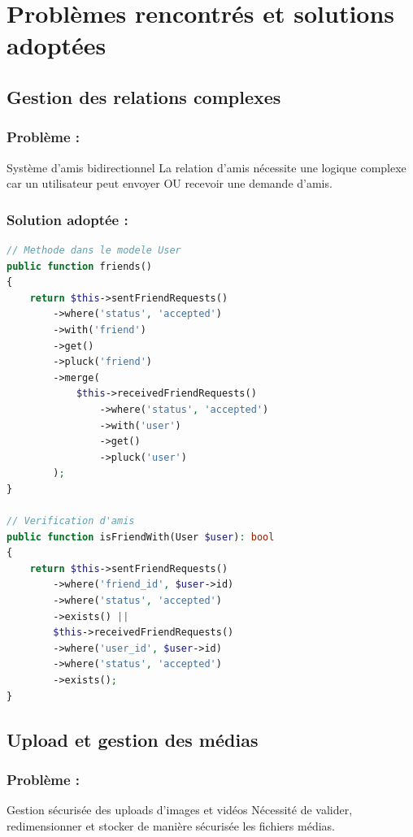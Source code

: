 \documentclass[12pt,a4paper]{article}
\begin{document}
\section{Probl\`emes rencontr\'es et solutions adopt\'ees}

\subsection{Gestion des relations complexes}

\subsubsection{Probl\`eme :} Syst\`eme d'amis bidirectionnel
La relation d'amis n\'ecessite une logique complexe car un utilisateur peut envoyer OU recevoir une demande d'amis.

\subsubsection{Solution adopt\'ee :}
\begin{lstlisting}[language=PHP]
// Methode dans le modele User
public function friends()
{
    return $this->sentFriendRequests()
        ->where('status', 'accepted')
        ->with('friend')
        ->get()
        ->pluck('friend')
        ->merge(
            $this->receivedFriendRequests()
                ->where('status', 'accepted')
                ->with('user')
                ->get()
                ->pluck('user')
        );
}

// Verification d'amis
public function isFriendWith(User $user): bool
{
    return $this->sentFriendRequests()
        ->where('friend_id', $user->id)
        ->where('status', 'accepted')
        ->exists() ||
        $this->receivedFriendRequests()
        ->where('user_id', $user->id)
        ->where('status', 'accepted')
        ->exists();
}
\end{lstlisting}

\subsection{Upload et gestion des m\'edias}

\subsubsection{Probl\`eme :} Gestion s\'ecuris\'ee des uploads d'images et vid\'eos
N\'ecessit\'e de valider, redimensionner et stocker de mani\`ere s\'ecuris\'ee les fichiers m\'edias.
\end{document}
